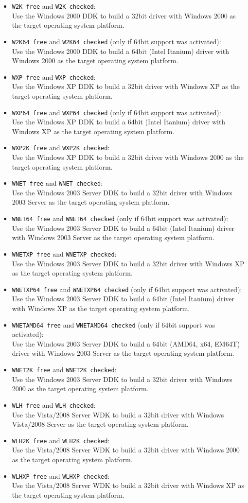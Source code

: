 \documentclass[a4paper,titlepage]{report}
\newcommand{\solcfg}[2]{\texttt{#1 free} and \texttt{#1 checked}:\\#2}
\newcommand{\solcfgsixfour}[2]{\texttt{#1 free} and \texttt{#1 checked} \textcolor[gray]{0.40}{\textsf{\small(only if 64bit support was activated)}}:\\#2}
\begin{document}
\begin{itemize}
  \item \solcfg{W2K}{Use the Windows 2000 DDK to build a 32bit driver with Windows 2000 as the target operating system platform.}
  \item \solcfgsixfour{W2K64}{Use the Windows 2000 DDK to build a 64bit (Intel Itanium) driver with Windows 2000 as the target operating system platform.}
  \item \solcfg{WXP}{Use the Windows XP DDK to build a 32bit driver with Windows XP as the target operating system platform.}
  \item \solcfgsixfour{WXP64}{Use the Windows XP DDK to build a 64bit (Intel Itanium) driver with Windows XP as the target operating system platform.}
  \item \solcfg{WXP2K}{Use the Windows XP DDK to build a 32bit driver with Windows 2000 as the target operating system platform.}
  \item \solcfg{WNET}{Use the Windows 2003 Server DDK to build a 32bit driver with Windows 2003 Server as the target operating system platform.}
  \item \solcfgsixfour{WNET64}{Use the Windows 2003 Server DDK to build a 64bit (Intel Itanium) driver with Windows 2003 Server as the target operating system platform.}
  \item \solcfg{WNETXP}{Use the Windows 2003 Server DDK to build a 32bit driver with Windows XP as the target operating system platform.}
  \item \solcfgsixfour{WNETXP64}{Use the Windows 2003 Server DDK to build a 64bit (Intel Itanium) driver with Windows XP as the target operating system platform.}
  \item \solcfgsixfour{WNETAMD64}{Use the Windows 2003 Server DDK to build a 64bit (AMD64, x64, EM64T) driver with Windows 2003 Server as the target operating system platform.}
  \item \solcfg{WNET2K}{Use the Windows 2003 Server DDK to build a 32bit driver with Windows 2000 as the target operating system platform.}
  \item \solcfg{WLH}{Use the Vista/2008 Server WDK to build a 32bit driver with Windows Vista/2008 Server as the target operating system platform.}
  \item \solcfg{WLH2K}{Use the Vista/2008 Server WDK to build a 32bit driver with Windows 2000 as the target operating system platform.}
  \item \solcfg{WLHXP}{Use the Vista/2008 Server WDK to build a 32bit driver with Windows XP as the target operating system platform.}

\end{itemize}
\end{document}
